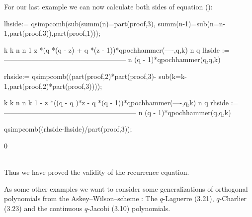 For our last example we can now calculate both sides of
equation ():

\begin{redoutput}
\redprompt lhside:= qsimpcomb(sub(summ(n)=part(proof,3),
    summ(n-1)=sub(n=n-1,part(proof,3)),part(proof,1)));

            k   k   n         n                       1
           z *(q *(q  - z) + q *(z - 1))*qpochhammer(----,q,k)
                                                       n
                                                      q
lhside := -----------------------------------------------------
                         n
                       (q  - 1)*qpochhammer(q,q,k)

\redprompt rhside:= qsimpcomb((part(proof,2)*part(proof,3)-
    sub(k=k-1,part(proof,2)*part(proof,3))));

               k    k    n       n   k                    1
            - z *((q  - q )*z - q *(q  - 1))*qpochhammer(----,q,k)
                                                           n
                                                          q
rhside := ---------------------------------------------------------
                           n
                         (q  - 1)*qpochhammer(q,q,k)

\redprompt qsimpcomb((rhside-lhside)/part(proof,3));

0
\end{redoutput}
%
\\[-2.5ex]\noindent{}
Thus we have proved the validity of the recurrence equation.

As some other examples we want to consider some generalizations
of orthogonal polynomials from the
Askey--Wilson--scheme \cite{KoekoekSwarttouw:94}: The $q$-Laguerre
(3.21), $q$-Charlier (3.23) and the continuous $q$-Jacobi (3.10)
polynomials.


